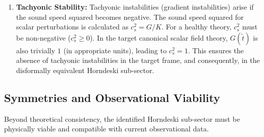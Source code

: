 \documentclass[twocolumn]{aastex631}
\begin{document}
\begin{enumerate}
    \item \textbf{Tachyonic Stability:} Tachyonic instabilities (gradient instabilities) arise if the sound speed squared becomes negative. The sound speed squared for scalar perturbations is calculated as $c_s^2 = G/K$. For a healthy theory, $c_s^2$ must be non-negative ($c_s^2 \ge 0$). In the target canonical scalar field theory, $G(\tilde{t})$ is also trivially $1$ (in appropriate units), leading to $c_s^2 = 1$. This ensures the absence of tachyonic instabilities in the target frame, and consequently, in the disformally equivalent Horndeski sub-sector.
\end{enumerate}

\subsection{Symmetries and Observational Viability}
Beyond theoretical consistency, the identified Horndeski sub-sector must be physically viable and compatible with current observational data.
\end{document}
